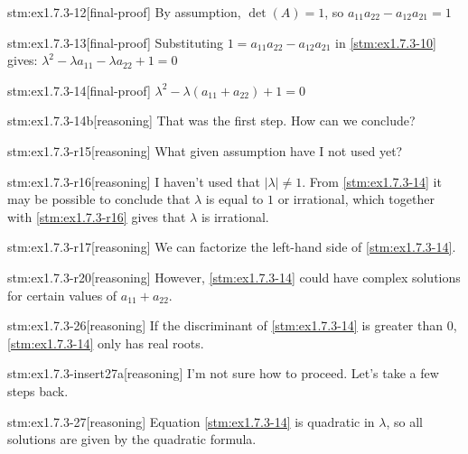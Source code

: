 \begin{stm}{stm:ex1.7.3-12}[final-proof]
By assumption, $\det(A) = 1$, so $a_{11}a_{22} - a_{12}a_{21} = 1$
\end{stm}

\begin{stm}{stm:ex1.7.3-13}[final-proof]
Substituting $1 = a_{11}a_{22} - a_{12}a_{21}$ in \ref{stm:ex1.7.3-10} gives: $\lambda^2 - \lambda a_{11} - \lambda a_{22} + 1 = 0$
\end{stm}

\begin{stm}{stm:ex1.7.3-14}[final-proof]
$\lambda^2 - \lambda(a_{11} + a_{22}) + 1 = 0$
\end{stm}

\begin{stm}{stm:ex1.7.3-14b}[reasoning]
That was the first step. How can we conclude?
\end{stm}

\begin{stm}{stm:ex1.7.3-r15}[reasoning]
What given assumption have I not used yet?
\end{stm}

\begin{stm}{stm:ex1.7.3-r16}[reasoning]
I haven't used that $|\lambda| \ne 1$. From \ref{stm:ex1.7.3-14} it may be possible to conclude that $\lambda$ is equal to $1$ or irrational, which together with \ref{stm:ex1.7.3-r16} gives that $\lambda$ is irrational.
\end{stm}

\begin{stm}{stm:ex1.7.3-r17}[reasoning]
We can factorize the left-hand side of \ref{stm:ex1.7.3-14}.
\end{stm}

\begin{stm}{stm:ex1.7.3-r20}[reasoning]
However, \ref{stm:ex1.7.3-14} could have complex solutions for certain values of $a_{11} + a_{22}$.
\end{stm}

\begin{stm}{stm:ex1.7.3-26}[reasoning]
If the discriminant of \ref{stm:ex1.7.3-14} is greater than $0$, \ref{stm:ex1.7.3-14} only has real roots.
\end{stm}

\begin{stm}{stm:ex1.7.3-insert27a}[reasoning]
I'm not sure how to proceed. Let's take a few steps back.
\end{stm}

\begin{stm}{stm:ex1.7.3-27}[reasoning]
Equation \ref{stm:ex1.7.3-14} is quadratic in $\lambda$, so all solutions are given by the quadratic formula.
\end{stm}

